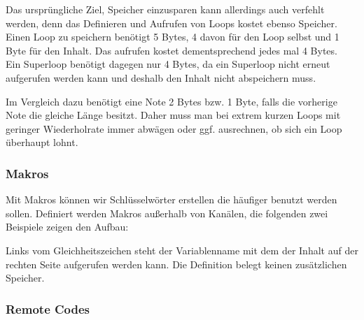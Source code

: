 Das ursprüngliche Ziel, Speicher einzusparen kann allerdings auch verfehlt werden, denn das Definieren und Aufrufen von Loops kostet ebenso Speicher. \\
Einen Loop zu speichern benötigt 5 Bytes, 4 davon für den Loop selbst und 1 Byte für den Inhalt. Das aufrufen kostet dementsprechend jedes mal 4 Bytes.\\
Ein Superloop benötigt dagegen nur 4 Bytes, da ein Superloop nicht erneut aufgerufen werden kann und deshalb den Inhalt nicht abspeichern muss.

Im Vergleich dazu benötigt eine Note 2 Bytes bzw. 1 Byte, falls die vorherige Note die gleiche Länge besitzt. Daher muss man bei extrem kurzen Loops mit geringer Wiederholrate immer abwägen oder ggf. ausrechnen, ob sich ein Loop überhaupt lohnt.

\subsubsection{Makros}

Mit Makros können wir Schlüsselwörter erstellen die häufiger benutzt werden sollen. Definiert werden Makros außerhalb von Kanälen, die folgenden zwei Beispiele zeigen den Aufbau:

\medskip



\medskip

Links vom Gleichheitszeichen steht der Variablenname mit dem der Inhalt auf der rechten Seite aufgerufen werden kann. Die Definition belegt keinen zusätzlichen Speicher.

\subsubsection{Remote Codes}